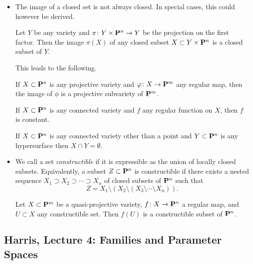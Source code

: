 \begin{itemize}
\item
  The image of a closed set is not always closed. In special cases, this could however be derived.
  
  \begin{theorem}
    Let $Y$ be any variety and $\pi \cn Y \x \P^n \rarr Y$ be the projection on the first factor. Then the image $\pi(X)$ of any closed subset $X \subset Y \x \P^n$ is a closed subset of $Y$.
  \end{theorem}

  This leads to the following.

  \begin{theorem}
    If $X \subset \P^n$ is any projective variety and $\phi \cn X \rarr \P^m$ any regular map, then the image of $\phi$ is a projective subvariety of $\P^m$.
  \end{theorem}

  \begin{corollary}
    If $X \subset \P^n$ is any connected variety and $f$ any regular function on $X$, then $f$ is constant.
  \end{corollary}

  \begin{corollary}
    If $X \subset \P^n$ is any connected variety other than a point and $Y \subset \P^n$ is any hypersurface then $X \cap Y = \emptyset$.
  \end{corollary}

\item
  We call a set \emph{constructible} if it is expressible as the union of locally closed subsets. Equivalently, a subset $Z \subset \P^n$ is constructible if there exists a nested sequence $X_1 \supset X_2 \supset \cdots \supset X_n$ of closed subsets of $\P^n$ such that
  \[
  Z = X_1 \setminus (X_2 \setminus (X_3 \setminus \cdots \setminus X_n)).
  \]

  \begin{theorem}[Chevalley]
    Let $X \subset \P^m$ be a quasi-projective variety, $f \cn X \rarr \P^n$ a regular map, and $U \subset X$ any constructible set. Then $f(U)$ is a constructible subset of $\P^n$.
  \end{theorem}
\end{itemize}

\subsection{Harris, Lecture 4: Families and Parameter Spaces}

